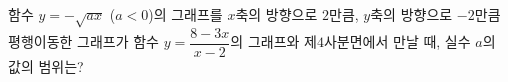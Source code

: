 함수 $y=-\sqrt{ax}$ ($a<0$)의 그래프를 $x$축의 방향으로 $2$만큼, $y$축의 방향으로 $-2$만큼 평행이동한 그래프가 함수 $y=\dfrac{8-3x}{x-2}$의 그래프와 제$4$사분면에서 만날 때, 실수 $a$의 값의 범위는?
